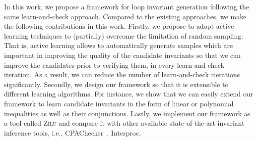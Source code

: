 In this work, we propose a framework for loop invariant generation following the same learn-and-check approach. %
Compared to the existing approaches, we make the following contributions in this work. Firstly, we propose to adopt active learning techniques to (partially) overcome the limitation of random sampling. That is, active learning allows to automatically generate samples which are important in improving the quality of the candidate invariants so that we can improve the candidates prior to verifying them, in every learn-and-check iteration. As a result, we can reduce the number of learn-and-check iterations significantly.
Secondly, we design our framework so that it is extensible to different learning algorithms. For instance, we show that we can easily extend our framework to learn candidate invariants in the form of linear or polynomial inequalities as well as their conjunctions.
Lastly, we implement our framework as a tool called \textsc{Zilu}
    and compare it with other available state-of-the-art invariant inference tools,
    i.e., CPAChecker~\cite{beyer2011cpachecker}, Interproc.
